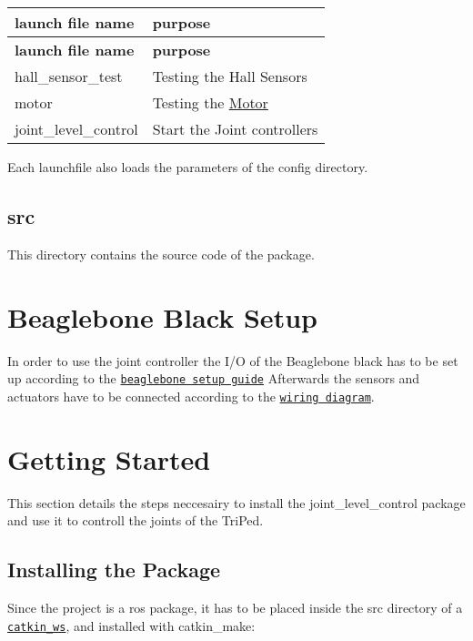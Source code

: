 \tabulinesep=1mm
\begin{longtabu} spread 0pt [c]{*{2}{|X[-1]}|}
\hline
\rowcolor{\tableheadbgcolor}\textbf{ launch file name }&\textbf{ purpose  }\\
\endfirsthead
\hline
\endfoot
\hline
\rowcolor{\tableheadbgcolor}\textbf{ launch file name }&\textbf{ purpose  }\\
\endhead
hall\+\_\+sensor\+\_\+test &Testing the Hall Sensors \\
motor &Testing the \hyperlink{classMotor}{Motor} \\
joint\+\_\+level\+\_\+control &Start the Joint controllers \\
\end{longtabu}
Each launchfile also loads the parameters of the config directory. \hypertarget{index_src_dir}{}\subsection{src}\label{index_src_dir}
This directory contains the source code of the package.\hypertarget{index_bbb_setup}{}\section{Beaglebone Black Setup}\label{index_bbb_setup}
In order to use the joint controller the I/O of the Beaglebone black has to be set up according to the \href{https://github.com/TriPed-Robot/Wiki/wiki/Beaglebone-Setup}{\tt beaglebone setup guide} Afterwards the sensors and actuators have to be connected according to the \href{https://github.com/TriPed-Robot/Wiki/wiki/Wiring-diagram}{\tt wiring diagram}. \hypertarget{index_getting_started}{}\section{Getting Started}\label{index_getting_started}
This section details the steps neccesairy to install the joint\+\_\+level\+\_\+control package and use it to controll the joints of the Tri\+Ped.\hypertarget{index_install}{}\subsection{Installing the Package}\label{index_install}
Since the project is a ros package, it has to be placed inside the src directory of a \href{http://wiki.ros.org/catkin}{\tt catkin\+\_\+ws}, and installed with {\ttfamily catkin\+\_\+make}\+:

